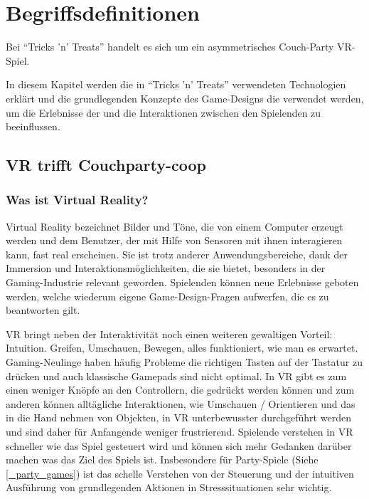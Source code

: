 \chapter{Begriffsdefinitionen}

Bei "`Tricks 'n' Treats"' handelt es sich um ein asymmetrisches Couch-Party VR-Spiel.

In diesem Kapitel werden die in "`Tricks 'n' Treats"' verwendeten Technologien erklärt und die grundlegenden Konzepte des Game-Designs die verwendet werden, um die  Erlebnisse der und die Interaktionen zwischen den Spielenden zu beeinflussen.

\section{VR trifft Couchparty-coop}

\subsection{Was ist Virtual Reality?}

Virtual Reality bezeichnet Bilder und Töne, die von einem Computer erzeugt werden und dem Benutzer, der mit Hilfe von Sensoren mit ihnen interagieren kann, fast real erscheinen\cite{_oxford_dict}. Sie ist trotz anderer Anwendungsbereiche, dank der Immersion und Interaktionsmöglichkeiten, die sie bietet, besonders in der Gaming-Industrie relevant geworden\cite{_bitkom_vr}. Spielenden können neue Erlebnisse geboten werden, welche wiederum eigene Game-Design-Fragen aufwerfen, die es zu beantworten gilt.

VR bringt neben der Interaktivität noch einen weiteren gewaltigen Vorteil: Intuition. Greifen, Umschauen, Bewegen, alles funktioniert, wie man es erwartet. Gaming-Neulinge haben häufig Probleme die richtigen Tasten auf der Tastatur zu drücken und auch klassische Gamepads sind nicht optimal. In VR gibt es zum einen weniger Knöpfe an den Controllern, die gedrückt werden können und zum anderen können alltägliche Interaktionen, wie Umschauen / Orientieren und das in die Hand nehmen von Objekten, in VR unterbewusster durchgeführt werden und sind daher für Anfangende weniger frustrierend. Spielende verstehen in VR schneller wie das Spiel gesteuert wird und können sich mehr Gedanken darüber machen was das Ziel des Spiels ist\cite{_natural_interaction_in__augmented_reality_context}. Insbesondere für Party-Spiele (Siehe \ref{_party_games}) ist das schelle Verstehen von der Steuerung und der intuitiven Ausführung von grundlegenden Aktionen in Stresssituationen sehr wichtig.

